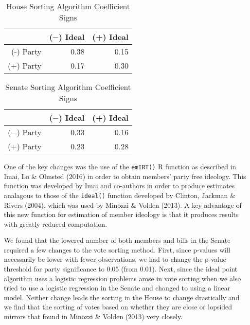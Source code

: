 \documentclass[12pt]{article}
\begin{document}
\begin{table}[H]
	\centering
	\caption{House Sorting Algorithm Coefficient Signs}
	\begin{tabular}{rrr}
		\hline
		& ($-$) Ideal & (+) Ideal \\ 
		\hline
		(-) Party & 0.38 & 0.15 \\ 
		(+) Party & 0.17 & 0.30 \\ 
		\hline
	\end{tabular}
\end{table}

\begin{table}[H]
	\centering
	\caption{Senate Sorting Algorithm Coefficient Signs}
	\begin{tabular}{rrr}
		\hline
		& ($-$) Ideal & (+) Ideal \\ 
		\hline
		($-$) Party & 0.33 & 0.16 \\ 
		(+) Party & 0.23 & 0.28 \\ 
		\hline
	\end{tabular}
\end{table}

One of the key changes was the use of the \verb|emIRT()| R function as described in Imai, Lo \& Olmsted (2016) in order to obtain members' party free ideology. This function was developed by Imai and co-authors in order to produce estimates analagous to those of the \verb|ideal()| function developed by Clinton, Jackman \& Rivers (2004), which was used by Minozzi \& Volden (2013). A key advantage of this new function for estimation of member ideology is that it produces results with greatly reduced computation.

We found that the lowered number of both members and bills in the Senate required a few changes to the vote sorting method. First, since p-values will necessarily be lower with fewer observations, we had to change the p-value threshold for party significance to 0.05 (from 0.01). Next, since the ideal point algorithm uses a logistic regression problems arose in vote sorting when we also tried to use a logistic regression in the Senate and changed to using a linear model. Neither change leads the sorting in the House to change drastically and we find that the sorting of votes based on whether they are close or lopsided mirrors that found in Minozzi \& Volden (2013) very closely.
\end{document}
